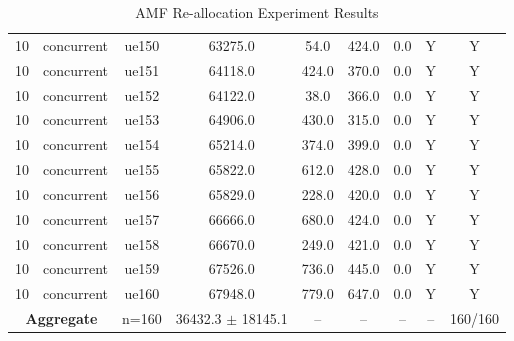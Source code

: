 \begin{table}[ht]
\begin{tabular}{|c|c|c|c|c|c|c|c|c|}
10 & concurrent & ue150 & 63275.0 & 54.0 & 424.0 & 0.0 & Y & Y \\
10 & concurrent & ue151 & 64118.0 & 424.0 & 370.0 & 0.0 & Y & Y \\
10 & concurrent & ue152 & 64122.0 & 38.0 & 366.0 & 0.0 & Y & Y \\
10 & concurrent & ue153 & 64906.0 & 430.0 & 315.0 & 0.0 & Y & Y \\
10 & concurrent & ue154 & 65214.0 & 374.0 & 399.0 & 0.0 & Y & Y \\
10 & concurrent & ue155 & 65822.0 & 612.0 & 428.0 & 0.0 & Y & Y \\
10 & concurrent & ue156 & 65829.0 & 228.0 & 420.0 & 0.0 & Y & Y \\
10 & concurrent & ue157 & 66666.0 & 680.0 & 424.0 & 0.0 & Y & Y \\
10 & concurrent & ue158 & 66670.0 & 249.0 & 421.0 & 0.0 & Y & Y \\
10 & concurrent & ue159 & 67526.0 & 736.0 & 445.0 & 0.0 & Y & Y \\
10 & concurrent & ue160 & 67948.0 & 779.0 & 647.0 & 0.0 & Y & Y \\
\multicolumn{2}{|c|}{\textbf{Aggregate}} & n=160 & 36432.3 $\pm$ 18145.1 & -- & -- & -- & -- & 160/160 \\
\hline
\end{tabular}
\caption{AMF Re-allocation Experiment Results}
\label{tab:amf_realloc}
\end{table}
